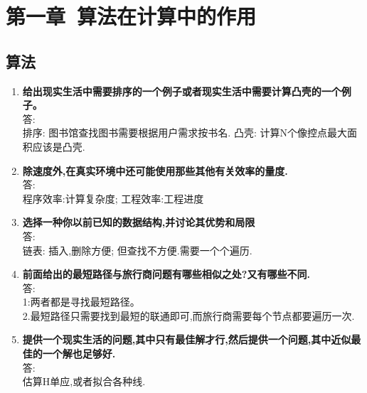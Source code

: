 \section{第一章\ 算法在计算中的作用}

\subsection{算法}
\begin{enumerate} %
\item
\textbf{给出现实生活中需要排序的一个例子或者现实生活中需要计算凸壳的一个例子。}
\\答:\\ 排序: 图书馆查找图书需要根据用户需求按书名. 凸壳: 计算N个像控点最大面积应该是凸壳.
\item
\textbf{除速度外,在真实环境中还可能使用那些其他有关效率的量度.}
\\答:\\ 程序效率:计算复杂度; 工程效率:工程进度
\item
\textbf{选择一种你以前已知的数据结构,并讨论其优势和局限}
\\答:\\ 链表: 插入,删除方便; 但查找不方便.需要一个个遍历.
\item
\textbf{前面给出的最短路径与旅行商问题有哪些相似之处?又有哪些不同.}
\\答:\\
1:两者都是寻找最短路径。\\ 2.最短路径只需要找到最短的联通即可,而旅行商需要每个节点都要遍历一次.
\item
\textbf{提供一个现实生活的问题,其中只有最佳解才行,然后提供一个问题,其中近似最佳的一个解也足够好.}
\\答:\\
估算H单应,或者拟合各种线.
\end{enumerate}

